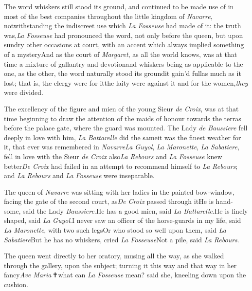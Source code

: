 \documentclass{article}
\begin{document}
The word whiskers still stood its\break
ground, and continued to be made use\break
of in most of the best companies through\-out the little kingdom of \textit{Navarre},
not\-withstanding the indiscreet use which \textit{La
Fosseuse} had made of it: the truth was,\break \textit{La
Fosseuse} had pronounced the word, not only before the
queen, but upon sun\-dry other occasions at court, with an
accent which always implied something of a mystery\tsh And
as the court of \textit{Margaret}, as all the world knows,
was at that time a mixture of gallantry and devotion\tsh and
whiskers being as applicable to the one, as the other, the
word naturally stood its ground\tsk it gain’d full\break as much
as it lost; that is, the clergy\break
were for it\tsk the laity were against it\tsk\break
and for the women,\tsh \textit{they} were divided.\tsh{}

The excellency of the figure and mien of the young Sieur
\textit{de Croix}, was at that time beginning to draw the
attention of the maids of honour towards the terras before
the palace gate, where the guard was mounted. The Lady
\textit{de Baussiere} fell deeply in love with him,\tsh
\textit{La Battarelle} did the same\tsk it was the finest
weather for it, that ever was remembered in\break
\textit{Navarre}\tsk \textit{La Guyol}, \textit{La
Maronette}, \textit{La Sabatiere}, fell in love with the Sieur
\textit{de Croix} also\tsk \textit{La Rebours} and
\textit{La Fosseuse} knew better\tsk \textit{De Croix} had
failed in an attempt to recommend himself to \textit{La
Rebours}; and \textit{La Rebours} and \textit{La
Fosseuse}\break
were inseparable.

The queen of \textit{Navarre} was sitting with her ladies in
the painted bow-window, facing the gate of the second court,
as\break \textit{De Croix} passed through it\tsk He is hand-
some, said the Lady \textit{Baussiere}.\tsk He has a good
mien, said \textit{La Battarelle}.\tsk He is finely shaped,
said \textit{La Guyol}.\tsk I never saw an officer of the
horse-guards in my life, said \textit{La Maronette}, with
two such legs\tsk Or who stood so well upon them, said
\textit{La Sabatiere}\tsh But he has no whiskers, cried
\textit{La Fosseuse}\tsk Not a pile, said \textit{La
Rebours}.

The queen went directly to her oratory, musing all the way,
as she walked through the gallery, upon the subject; turning
it this way and that way in her fancy\tsh\textit{Ave
Maria}\,✝︎\tsk what can \textit{La Fosseuse} mean? said she,
kneeling down upon the cushion.
\end{document}

